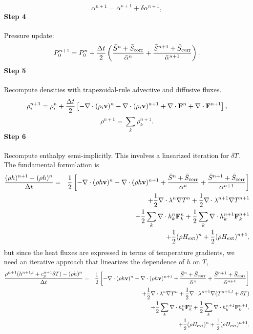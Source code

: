 \documentclass[final]{siamltex}
\def\Fb {{\bf F}}
\def\vb {{\bf v}}
\def\Hext {H_{\rm ext}}
\def\half   {\frac{1}{2}}
\begin{document}
\begin{equation}
\alpha^{n+1} = \bar{\alpha}^{n+1} + \delta\alpha^{n+1},
\end{equation}
{\bf Step 4}\\ \\
Pressure update:
\begin{equation}
P_0^{n+1} = P_0^n + \frac{\Delta t}{2}\left(\frac{\bar{S}^n + \bar{S}_{\rm corr}}{\bar{\alpha}^n} + \frac{\bar{S}^{n+1} + \bar{S}_{\rm corr}}{\bar{\alpha}^{n+1}}\right).
\end{equation}
{\bf Step 5}\\ \\
Recompute densities with trapezoidal-rule advective and diffusive fluxes.
\begin{equation}
\rho_i^{n+1} = \rho_i^n + \frac{\Delta t}{2}\left[-\nabla\cdot(\rho_i\vb)^n -\nabla\cdot(\rho_i\vb)^{n+1} + \nabla\cdot\Fb^n + \nabla\cdot\Fb^{n+1}\right],
\end{equation}
\begin{equation}
\rho^{n+1} = \sum_k\rho_k^{n+1}.
\end{equation}
{\bf Step 6}\\ \\
Recompute enthalpy semi-implicitly.  This involves a linearized iteration 
for $\delta T$.  The fundamental formulation is
\begin{eqnarray}
\frac{(\rho h)^{n+1} - (\rho h)^n}{\Delta t} &=& \half\left[-\nabla\cdot(\rho h\vb)^n -\nabla\cdot(\rho h\vb)^{n+1} + \frac{\bar{S}^n + \bar{S}_{\rm corr}}{\bar{\alpha}^n} + \frac{\bar{S}^{n+1}+ \bar{S}_{\rm corr}}{\bar{\alpha}^{n+1}}\right]\nonumber\\
&&+ \half\nabla\cdot\lambda^n\nabla T^n + \half\nabla\cdot\lambda^{n+1}\nabla T^{n+1}\nonumber\\
&&+ \half\sum_k\nabla\cdot h_k^n\Fb_k^n + \half\sum_k\nabla\cdot h_k^{n+1}\Fb_k^{n+1}\nonumber\\
&&+ \half(\rho\Hext)^n + \half(\rho\Hext)^{n+1},
\end{eqnarray}
but since the heat fluxes are expressed in terms of temperature gradients, we
need an iterative approach that linearizes the dependence of $h$ on $T$,
\begin{eqnarray}
\frac{\rho^{n+1}(h^{n+1,l} + c_p^{n+1}\delta T) - (\rho h)^n}{\Delta t} &=& \half\left[-\nabla\cdot(\rho h\vb)^n -\nabla\cdot(\rho h\vb)^{n+1} + \frac{\bar{S}^n + \bar{S}_{\rm corr}}{\bar{\alpha}^n} + \frac{\bar{S}^{n+1}+ \bar{S}_{\rm corr}}{\bar{\alpha}^{n+1}}\right]\nonumber\\
&&\hspace{-1in} + \half\nabla\cdot\lambda^n\nabla T^n + \half\nabla\cdot\lambda^{n+1}\nabla(T^{n+1,l} + \delta T)\nonumber\\
&&\hspace{-1in} + \half\sum_k\nabla\cdot h_k^n \Fb_k^n + \half\sum_k\nabla\cdot h_k^{n+1} \Fb_k^{n+1},\nonumber\\
&&\hspace{-1in} + \half(\rho\Hext)^n + \half(\rho\Hext)^{n+1},
\end{eqnarray}
\end{document}
